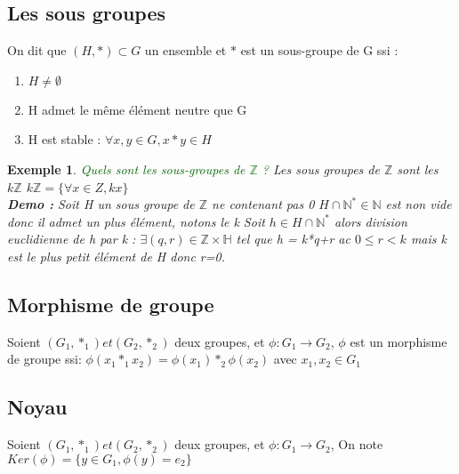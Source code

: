 \documentclass[12pt]{report}
\theoremstyle{break}%
\newtheorem{monex}{Exemple}[chapter]
\begin{document}
\subsection{Les sous groupes}
\begin{madef}
	On dit que $(H, \ast) \subset G$ un ensemble et $\ast$ est un sous-groupe de G ssi :
	\begin{enumerate}
		\item $H \neq \emptyset$
		\item H admet le m\^eme \'el\'ement neutre que G
		\item H est stable : $\forall x, y \in G, x*y \in H$ 
	\end{enumerate}
\end{madef}
\begin{monex}
	\textcolor{darkgreen}{Quels sont les sous-groupes de $\mathbb{Z}$ ?}
	\newline
	Les sous groupes de $\mathbb{Z}$ sont les $k\mathbb{Z}$
	\newline
	$k\mathbb{Z} = \{\forall x \in Z, kx\}$ 
	\newline
	\\
	\textbf {Demo :}
	Soit H un sous groupe de $\mathbb{Z}$ ne contenant pas 0
	\newline
	$H \cap \mathbb{N^*} \in \mathbb{N}$ est non vide donc il admet un plus \'el\'ement, notons le k \newline
	Soit $h \in H \cap \mathbb{N^*}$ alors division euclidienne de h par k : $\exists (q,r) \in \mathbb{Z} \times \mathbb{H}$ tel que h = k*q+r ac $0 \le r < k$ mais k est le plus petit \'el\'ement de H donc r=0. 
\end{monex}

\subsection{Morphisme de groupe}
\begin{madef}
	Soient $(G_1, \ast_1) et (G_2, \ast_2)$ deux groupes, et
	$\phi : G_1 \longrightarrow G_2$, 
	\newline 
	$\phi$ est un morphisme de groupe ssi:
	$\phi(x_1*_1x_2) = \phi(x_1) *_2 \phi(x_2)$ avec $x_1, x_2 \in G_1$
\end{madef}

\subsection{Noyau}
\begin{madef}
	Soient $(G_1, \ast_1) et (G_2, \ast_2)$ deux groupes, et
	$\phi : G_1 \longrightarrow G_2$, 
	\newline
	On note $Ker(\phi) = \{y\in G_1, \phi(y)=e_2\} $
\end{madef}
\end{document}
